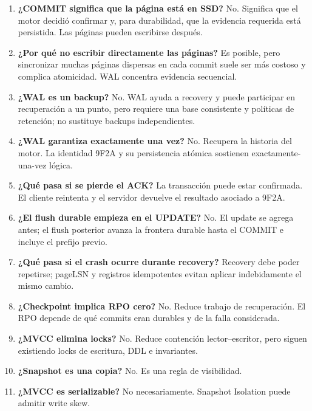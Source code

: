 \documentclass[variant=docente,cover=institutional,mode=screen]{ua-engineering-v6-article}
\begin{document}
\begin{enumerate}
\item \textbf{¿COMMIT significa que la página está en SSD?} No. Significa que el motor decidió confirmar y, para durabilidad, que la evidencia requerida está persistida. Las páginas pueden escribirse después.

\item \textbf{¿Por qué no escribir directamente las páginas?} Es posible, pero sincronizar muchas páginas dispersas en cada commit suele ser más costoso y complica atomicidad. WAL concentra evidencia secuencial.

\item \textbf{¿WAL es un backup?} No. WAL ayuda a recovery y puede participar en recuperación a un punto, pero requiere una base consistente y políticas de retención; no sustituye backups independientes.

\item \textbf{¿WAL garantiza exactamente una vez?} No. Recupera la historia del motor. La identidad 9F2A y su persistencia atómica sostienen exactamente-una-vez lógica.

\item \textbf{¿Qué pasa si se pierde el ACK?} La transacción puede estar confirmada. El cliente reintenta y el servidor devuelve el resultado asociado a 9F2A.

\item \textbf{¿El flush durable empieza en el UPDATE?} No. El update se agrega antes; el flush posterior avanza la frontera durable hasta el COMMIT e incluye el prefijo previo.

\item \textbf{¿Qué pasa si el crash ocurre durante recovery?} Recovery debe poder repetirse; pageLSN y registros idempotentes evitan aplicar indebidamente el mismo cambio.

\item \textbf{¿Checkpoint implica RPO cero?} No. Reduce trabajo de recuperación. El RPO depende de qué commits eran durables y de la falla considerada.

\item \textbf{¿MVCC elimina locks?} No. Reduce contención lector--escritor, pero siguen existiendo locks de escritura, DDL e invariantes.

\item \textbf{¿Snapshot es una copia?} No. Es una regla de visibilidad.

\item \textbf{¿MVCC es serializable?} No necesariamente. Snapshot Isolation puede admitir write skew.


\end{enumerate}
\end{document}
